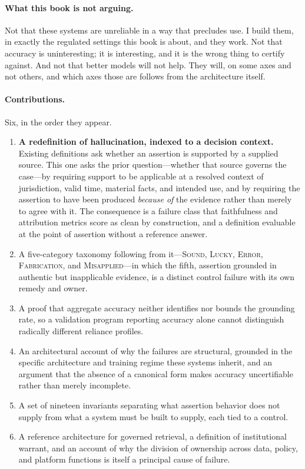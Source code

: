 \paragraph{What this book is not arguing.} Not that these systems are
unreliable in a way that precludes use. I build them, in exactly the regulated
settings this book is about, and they work. Not that accuracy is uninteresting;
it is interesting, and it is the wrong thing to certify against. And not that
better models will not help. They will, on some axes and not others, and which
axes those are follows from the architecture itself.

\paragraph{Contributions.} Six, in the order they appear.

\begin{enumerate}
  \item \textbf{A redefinition of hallucination, indexed to a decision context.}
        Existing definitions ask whether an assertion is supported by a supplied
        source. This one asks the prior question---whether that source governs the
        case---by requiring support to be applicable at a resolved context of
        jurisdiction, valid time, material facts, and intended use, and by
        requiring the assertion to have been produced \emph{because of} the evidence
        rather than merely to agree with it. The consequence is a failure class that
        faithfulness and attribution metrics score as clean by construction, and a
        definition evaluable at the point of assertion without a reference answer.
  \item A five-category taxonomy following from it---\textsc{Sound},
        \textsc{Lucky}, \textsc{Error}, \textsc{Fabrication}, and
        \textsc{Misapplied}---in which the fifth, assertion grounded in authentic
        but inapplicable evidence, is a distinct control failure with its own
        remedy and owner.
  \item A proof that aggregate accuracy neither identifies nor bounds the grounding
        rate, so a validation program reporting accuracy alone cannot distinguish
        radically different reliance profiles.
  \item An architectural account of why the failures are structural, grounded in the
        specific architecture and training regime these systems inherit, and an
        argument that the absence of a canonical form makes accuracy uncertifiable
        rather than merely incomplete.
  \item A set of nineteen invariants separating what assertion behavior does not
        supply from what a system must be built to supply, each tied to a control.
  \item A reference architecture for governed retrieval, a definition of
        institutional warrant, and an account of why the division of ownership
        across data, policy, and platform functions is itself a principal cause of
        failure.
\end{enumerate}

